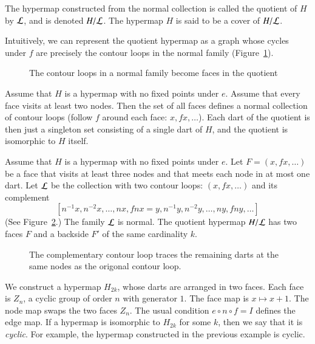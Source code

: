 \begin{definition}[quotient]  The hypermap constructed from the normal collection
is called the quotient of $H$ by $\cal L$, and is denoted $H/{\cal
L}$.  The hypermap $H$ is said to be a cover of $H/{\cal L}$.
\end{definition}

Intuitively, we can represent the quotient hypermap as a graph whose
cycles under $f$ 
are precisely the contour loops in the normal family (Figure~\ref{fig:quot}).

\begin{figure}[htb]
  \centering
  \caption{The contour loops in a normal 
   family become faces in the
   quotient}
  \label{fig:quot}
\end{figure}


\begin{example}\label{ex:Hall} 
Assume that $H$ is a hypermap with no fixed points under $e$.
Assume that every face visits at least two nodes.
Then the set of all faces
defines a normal collection of contour loops (follow $f$ around each face:
$x,f x,\ldots$).  Each dart of the quotient is then just a singleton
set consisting of a single dart of $H$, and the quotient is
isomorphic to $H$ itself.
\end{example}

\begin{example}\label{ex:H2} 
Assume that $H$ is a hypermap with no fixed points
under $e$.  Let $F = (x,f x,\ldots)$ be a face 
that visits at least
three nodes and that meets each node in at most one dart.
Let $\cal L$ be the
collection with two contour loops:  $(x,f x,\ldots)$ and its
complement
$$[n^{-1} x,
n^{-2} x,\ldots,n x,f n x = y,n^{-1} y, n^{-2} y,\ldots, n y, f n
y,\ldots]
$$
(See Figure~\ref{fig:contour-comp}.) 
The family $\cal L$ is normal.
The quotient hypermap $H/{\cal L}$ has two faces $F$ and a
backside $F'$ of the same cardinality $k$.
\end{example}


\begin{figure}[htb]
  \centering
  \caption{The complementary contour loop traces the remaining darts
   at the same nodes as the origonal contour loop.}
  \label{fig:contour-comp}
\end{figure}


\begin{example}\label{ex:H2k} 
We 
construct a
hypermap $H_{2k}$, whose darts are arranged in two faces.  Each
face is $Z_n$, a cyclic group of order $n$ with generator $1$.
The face map is $x\mapsto x+1$.
The node map swaps the two faces $Z_n$.
The usual condition $e\circ n\circ f = I$ defines the edge map.
If a hypermap is isomorphic to $H_{2k}$ for
some $k$, then we say that it is {\it cyclic}.  For example,
the hypermap constructed in the previous example is cyclic.
\end{example}

